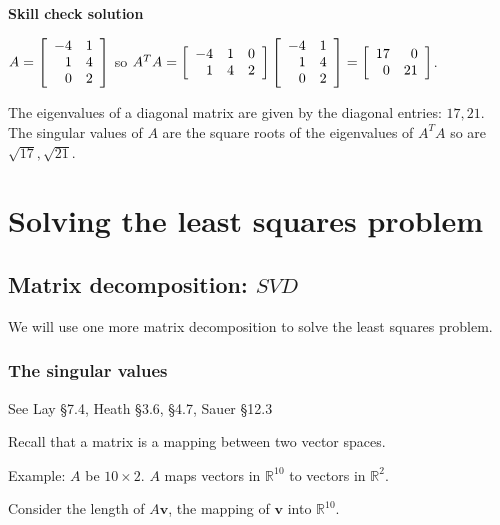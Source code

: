 \documentclass[12pt,letterpaper,noanswers]{exam}
\begin{document}
\noindent \textbf{Skill check solution}
\begin{questions}
\item $A = \left[\begin{array}{r r}
-4 & 1 \\
1 & 4 \\
0 & 2
\end{array}\right]$ so $A^TA = \left[\begin{array}{r r r}
-4 & 1 & 0 \\
1 & 4 & 2
\end{array}\right]\left[\begin{array}{r r}
-4 & 1 \\
1 & 4 \\
0 & 2
\end{array}\right] = \left[\begin{array}{r r}
17 & 0 \\
0 & 21
\end{array}\right]$.

The eigenvalues of a diagonal matrix are given by the diagonal entries: $17, 21$.  The singular values of $A$ are the square roots of the eigenvalues of $A^TA$ so are $\sqrt{17}, \sqrt{21}$.

\end{questions}

\section{Solving the least squares problem}

\subsection{Matrix decomposition: $SVD$}

We will use one more matrix decomposition to solve the least squares problem.

\subsubsection{The singular values}
See Lay \S 7.4, Heath \S 3.6, \S 4.7, Sauer \S 12.3

Recall that a matrix is a mapping between two vector spaces.

Example: $A$ be $10\times 2$.  $A$ maps vectors in $\mathbb{R}^{10}$ to vectors in $\mathbb{R}^2$.

Consider the length of $A\mathbf{v}$, the mapping of $\mathbf{v}$ into $\mathbb{R}^{10}$.
\end{document}
